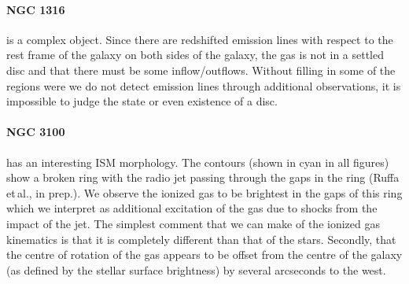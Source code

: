 \documentclass[a4paper,fleqn,usenatbib]{mnras}
\begin{document}
		\paragraph{NGC 1316} is a complex object. Since there are redshifted emission lines with respect to the rest frame of the galaxy on both sides of the galaxy, the gas is not in a settled disc and that there must be some inflow/outflows. 
		Without filling in some of the regions were we do not detect emission lines through additional observations, it is impossible to judge the state or even existence of a disc. 




		\paragraph{NGC 3100} has an interesting ISM morphology. The  contours (shown in cyan in all figures) show a broken ring with the radio jet passing through the gaps in the ring (Ruffa et\,al., in prep.). We observe the ionized gas to be brightest in the gaps of this ring which we interpret as additional excitation of the gas due to shocks from the impact of the jet. The simplest comment that we can make of the ionized gas kinematics is that it is completely different than that of the stars. Secondly, that the centre of rotation of the gas appears to be offset from the centre of the galaxy (as defined by the stellar surface brightness) by several arcseconds to the west. 
\end{document}
